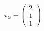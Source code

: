 \documentclass[preview]{standalone}
\begin{document}
\begin{align*}
\mathbf{v_3} = \begin{pmatrix} 2 \\ 1 \\ 1 \end{pmatrix}
\end{align*}
\end{document}
